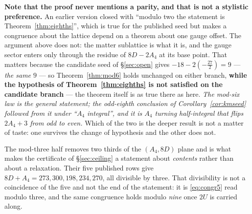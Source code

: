 \documentclass[11pt,a4paper]{article}
\begin{document}
\noindent \textbf{Note that the proof never mentions a parity, and that is not a stylistic
preference.} An earlier version closed with ``modulo two the statement is
Theorem~\ref{thm:eighths}'', which is true for the published seed but makes a congruence about the
lattice depend on a theorem about one gauge offset. The argument above does not: the matter
sublattice is what it is, and the gauge sector enters only through the residue of $8D-2A_4$ at its
base point. That matters because the candidate seed of \S\ref{sec:open} gives
$-18-2(-\tfrac{27}{2})=9$ --- \emph{the same $9$} --- so Theorem~\ref{thm:mod6} holds unchanged on
either branch, \textbf{while the hypothesis of Theorem~\ref{thm:eighths} is not satisfied on the
candidate branch} --- the theorem itself is as true there as here. \emph{The mod-six law is the
general statement; the odd-eighth conclusion of Corollary~\ref{cor:kmseed} followed from it under
``$A_4$ integral'', and it is $A_4$ turning
half-integral that flips $2A_4+3$ from odd to even.} Which of the two is the deeper result is
not a matter of taste: one survives the change of hypothesis and the other does not.

\noindent The mod-three
half removes two thirds of the $(A_4,8D)$ plane and is what makes the certificate of
\S\ref{sec:ceiling} a statement about \emph{contents} rather than about a relaxation. Their five
published rows give $8D+A_4=273,300,198,234,270$, all divisible by three. That divisibility is not
a coincidence of the five and not the end of the statement: it is \eqref{eq:congr5} read modulo
three, and the same congruence holds modulo \emph{nine} once $2U$ is carried along.
\end{document}
